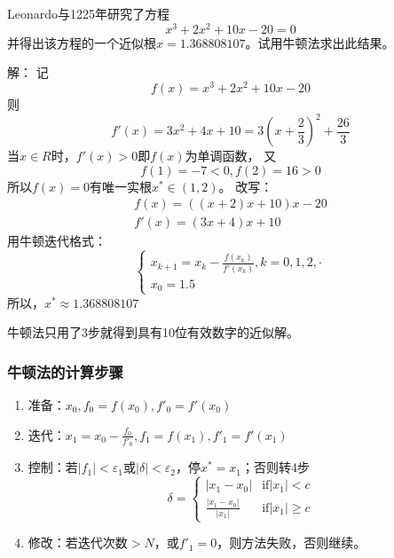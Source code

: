 \begin{example}
    Leonardo与1225年研究了方程
    \begin{equation*}
        x^3+2x^2+10x-20 = 0
    \end{equation*}
    并得出该方程的一个近似根$x = 1.368808107$。试用牛顿法求出此结果。
    \begin{solution}
        解：
        记\[f(x)=x^3+2x^2+10x-20\]
        则\[f'(x)=3x^2+4x+10=3(x+\frac{2}{3})^2+\frac{26}{3}\]
        当$x \in R$时，$f'(x) > 0$即$f(x)$为单调函数，
        又\[f(1) = -7 < 0,f(2) = 16 > 0\]
        所以$f(x) = 0$有唯一实根$x^* \in(1,2)$。
        改写：
        \begin{align*}
            f(x) = ((x+2)x+10)x-20\\
            f'(x) = (3x+4)x+10
        \end{align*}
        用牛顿迭代格式：
        \begin{equation*}
            \begin{cases}
                x_{k+1} = x_k-\frac{f(x_k)}{f'(x_k)},k=0,1,2,\cdot\\
                x_0 = 1.5
            \end{cases}
        \end{equation*}
        所以，$x^* \approx 1.368808107$
    \end{solution}
    \begin{remark}
        牛顿法只用了3步就得到具有10位有效数字的近似解。
    \end{remark}
\end{example}

\subsubsection{牛顿法的计算步骤}
\begin{enumerate}
    \item 准备：$x_0,f_0 = f(x_0),f'_0 = f'(x_0)$
    \item 迭代：$x_1 = x_0-\frac{f_0}{f'_0},f_1 = f(x_1),f'_1 = f'(x_1)$
    \item 控制：若$|f_1|<\varepsilon_1$或$|\delta|<\varepsilon_2$，停$x^* = x_1$；否则转4步
         \begin{equation*}
            \delta = 
            \begin{cases}
                |x_1-x_0| & \text{if} |x_1|<c\\
                \frac{|x_1-x_0|}{|x_1|} & \text{if} |x_1| \geq c
            \end{cases}
         \end{equation*}
    \item 修改：若迭代次数$>N$，或$f'_1 = 0$，则方法失败，否则继续。
\end{enumerate}

